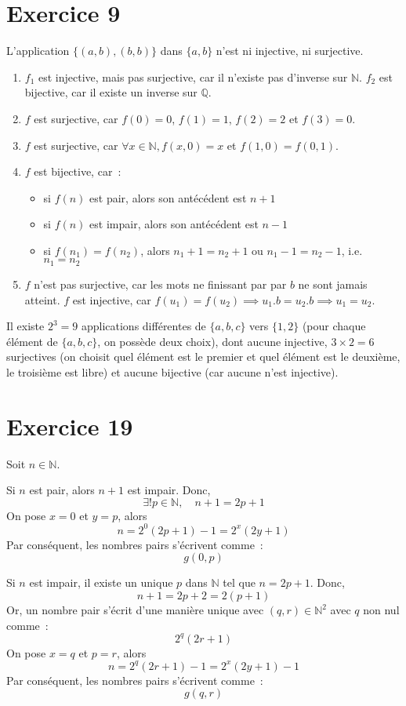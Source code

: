 \documentclass[a4paper]{article}
\begin{document}
    \section*{Exercice 9}
    L'application $\{(a,b), (b,b)\}$ dans $\{a,b\}$ n'est ni injective, ni surjective.
    \begin{enumerate}
        \item $f_1$ est injective, mais pas surjective, car il n'existe pas d'inverse sur $\mathbb{N}$.
            $f_2$ est bijective, car il existe un inverse sur $\mathbb{Q}$.
        \item $f$ est surjective, car $f(0) = 0$, $f(1) = 1$, $f(2) = 2$ et $f(3) = 0$.
        \item $f$ est surjective, car $\forall x\in\mathbb{N}, f(x, 0) = x$ et $f(1,0) = f(0,1)$.
        \item $f$ est bijective, car~:
            \begin{itemize}
                \item si $f(n)$ est pair, alors son antécédent est $n+1$
                \item si $f(n)$ est impair, alors son antécédent est $n-1$
                \item si $f(n_1) = f(n_2)$, alors $n_1 + 1 = n_2 + 1$ ou $n_1 - 1 = n_2 - 1$, i.e. $n_1=n_2$
            \end{itemize}
        \item $f$ n'est pas surjective, car les mots ne finissant par par $b$ ne sont jamais atteint.
            $f$ est injective, car $f(u_1) = f(u_2) \implies u_1.b = u_2.b\implies u_1 = u_2$. 
    \end{enumerate}
    Il existe $2^3 = 9$ applications différentes de $\{a,b,c\}$ vers $\{1,2\}$ (pour chaque élément de $\{a,b,c\}$, on
    possède deux choix), dont aucune injective, $3\times 2 = 6$ surjectives (on choisit quel élément est le premier et 
    quel élément est le deuxième, le troisième est libre) et aucune bijective (car aucune n'est injective).
    \section*{Exercice 19}
    Soit $n\in\mathbb{N}$.

    Si $n$ est pair, alors $n+1$ est impair.
    Donc, $$ \exists !p\in\mathbb{N},\quad n+1=2p+1 $$
    On pose $x=0$ et $y=p$, alors $$ n = 2^0 (2p+1) - 1 = 2^x(2y+1) $$
    Par conséquent, les nombres pairs s'écrivent comme~:
    $$ g(0,p) $$

    Si $n$ est impair, il existe un unique $p$ dans $\mathbb{N}$ tel que $n = 2p+1$.
    Donc, $$ n+1 = 2p+2 = 2(p+1) $$
    Or, un nombre pair s'écrit d'une manière unique avec $(q,r)\in\mathbb{N}^2$ avec $q$ non nul comme~:
    $$ 2^q(2r+1) $$
    On pose $x=q$ et $p=r$, alors $$ n = 2^q(2r+1) - 1 = 2^x(2y+1) - 1 $$
    Par conséquent, les nombres pairs s'écrivent comme~:
    $$ g(q,r) $$
\end{document}

